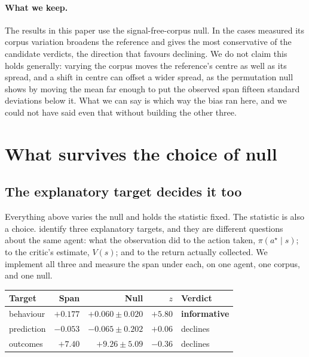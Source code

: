\documentclass[10pt,twocolumn]{article}
\begin{document}
\paragraph{What we keep.}
The results in this paper use the signal-free-corpus null. In the cases measured
its corpus variation broadens the reference and gives the most conservative of
the candidate verdicts, the direction that favours declining. We do not claim
this holds generally: varying the corpus moves the reference's centre as well as
its spread, and a shift in centre can offset a wider spread, as the permutation
null shows by moving the mean far enough to put the observed span fifteen
standard deviations below it. What we can say is which way the bias ran here,
and we could not have said even that without building the other three.

\section{What survives the choice of null}
\label{sec:survives}

\subsection{The explanatory target decides it too}
\label{sec:targets}

Everything above varies the null and holds the statistic fixed. The statistic is
also a choice. \citet{beechey2023sverl} identify three explanatory targets, and
they are different questions about the same agent: what the observation did to
the action taken, $\pi(a^\star \mid s)$; to the critic's estimate, $V(s)$; and to
the return actually collected. We implement all three and measure the span under
each, on one agent, one corpus, and one null.

\begin{center}\footnotesize
\begin{tabular}{lrrrl}
\toprule
Target & Span & Null & $z$ & Verdict \\
\midrule
behaviour & $+0.177$ & $+0.060 \pm 0.020$ & $\mathbf{+5.80}$ & \textbf{informative} \\
prediction & $-0.053$ & $-0.065 \pm 0.202$ & $+0.06$ & declines \\
outcomes & $+7.40$ & $+9.26 \pm 5.09$ & $-0.36$ & declines \\
\bottomrule
\end{tabular}
\end{center}
\end{document}
